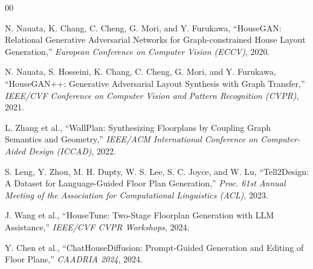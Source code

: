 \documentclass[10pt, twocolumn, letterpaper]{article}
\begin{document}
  \begin{thebibliography}{00}

  N. Nauata, K. Chang, C. Cheng, G. Mori, and Y. Furukawa, ``HouseGAN:
  Relational Generative Adversarial Networks for Graph-constrained House Layout
  Generation,'' \textit{European Conference on Computer Vision (ECCV)}, 2020.

  N. Nauata, S. Hosseini, K. Chang, C. Cheng, G. Mori, and Y. Furukawa,
  ``HouseGAN++: Generative Adversarial Layout Synthesis with Graph Transfer,''
  \textit{IEEE/CVF Conference on Computer Vision and Pattern Recognition
  (CVPR)}, 2021.

  L. Zhang et al., ``WallPlan: Synthesizing Floorplans by Coupling Graph
  Semantics and Geometry,'' \textit{IEEE/ACM International Conference on
  Computer-Aided Design (ICCAD)}, 2022.

  S. Leng, Y. Zhou, M. H. Dupty, W. S. Lee, S. C. Joyce, and W. Lu,
  ``Tell2Design: A Dataset for Language-Guided Floor Plan Generation,''
  \textit{Proc. 61st Annual Meeting of the Association for Computational
  Linguistics (ACL)}, 2023.

  J. Wang et al., ``HouseTune: Two-Stage Floorplan Generation with LLM
  Assistance,'' \textit{IEEE/CVF CVPR Workshops}, 2024.

  Y. Chen et al., ``ChatHouseDiffusion: Prompt-Guided Generation and Editing
  of Floor Plans,'' \textit{CAADRIA 2024}, 2024.

  \end{thebibliography}

  
\end{document}
